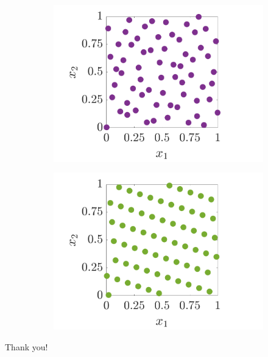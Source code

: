 \documentclass[handout, 10pt,compress,xcolor={usenames,dvipsnames}]{beamer} %
\begin{document}
{\begin{figure}[htp]
\begin{subfigure}[b]{0.35\textwidth}
    \end{subfigure}
    \centering
    \begin{subfigure}[b]{0.35\textwidth}
    \includegraphics[width=\textwidth]{figures/SSobolPoints}
    \end{subfigure}
    \centering
    \begin{subfigure}[b]{0.35\textwidth}
    \includegraphics[width=\textwidth]{figures/ShiftedLatticePoints}
    \end{subfigure}
\end{figure}
}
\fi


\begin{frame}[plain,c]

\begin{center}
\Huge Thank you!
\end{center}

\end{frame}
\end{document}
